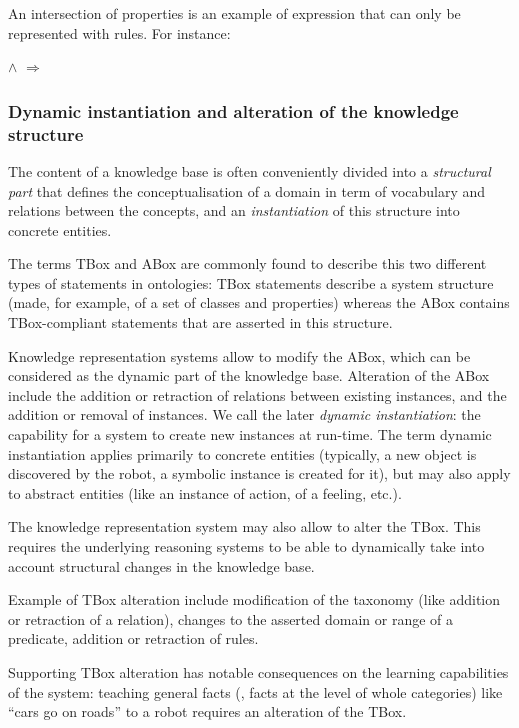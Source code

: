 An intersection of properties is an example of expression that can only be
represented with rules. For instance:

\footnotesize
{} $\land$ 
$\Rightarrow$ 
\normalsize

\subsubsection{Dynamic instantiation and alteration of the knowledge structure}

The content of a knowledge base is often conveniently divided into a
\emph{structural part} that defines the conceptualisation of a domain in term
of vocabulary and relations between the concepts, and an \emph{instantiation} of
this structure into concrete entities.

The terms TBox and ABox are commonly found to describe this two different types
of statements in ontologies: TBox statements describe a system structure (made,
for example, of a set of classes and properties) whereas the ABox contains
TBox-compliant statements that are asserted in this structure.

Knowledge representation systems allow to modify the ABox, which can be
considered as the dynamic part of the knowledge base. Alteration of the ABox
include the addition or retraction of relations between existing instances,
and the addition or removal of instances. We call the later \emph{dynamic
instantiation}: the capability for a system to create new instances at
run-time. The term dynamic instantiation applies primarily to concrete entities
(typically, a new object is discovered by the robot, a symbolic instance is
created for it), but may also apply to abstract entities (like an instance of
action, of a feeling, etc.).

The knowledge representation system may also allow to alter the TBox. This
requires the underlying reasoning systems to be able to dynamically take into
account structural changes in the knowledge base.

Example of TBox alteration include modification of the taxonomy (like addition
or retraction of a  relation), changes to the asserted
domain or range of a predicate, addition or retraction of rules.

Supporting TBox alteration has notable consequences on the learning
capabilities of the system: teaching general facts (\ie, facts at the level of
whole categories) like ``cars go on roads'' to a robot requires an alteration
of the TBox.

